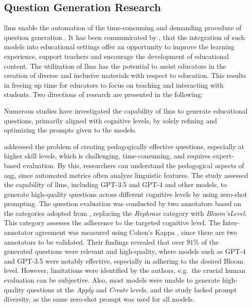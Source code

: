 \subsection{Question Generation Research}
\label{sec:question-generation-research}

\ac{llms} enable the automation of the time-consuming and demanding procedure of question generation \cite{vu_chatgpt-based_2024}. It has been communicated by \cite{naveed_comprehensive_2024}, that the integration of such models into educational settings offer an opportunity to improve the learning experience, support teachers and encourage the development of educational content. The utilization of \ac{llms} has the potential to assist educators in the creation of diverse and inclusive materials with respect to education. This results in freeing up time for educators to focus on teaching and interacting with students. Two directions of research are presented in the following:

 Numerous studies have investigated the capability of \ac{llms} to generate educational questions, primarily aligned with cognitive levels, by solely refining and optimizing the prompts given to the models.

\cite{scaria_how_2024} addressed the problem of creating pedagogically effective questions, especially at higher skill levels, which is challenging, time-consuming, and requires expert-based evaluation. By this, researchers can understand the pedagogical aspects of \ac{aqg}, since automated metrics often analyze linguistic features. The study assessed the capability of \ac{llms}, including GPT-3.5 and GPT-4 and other models, to generate high-quality questions across different cognitive levels by using zero-shot prompting. The question evaluation was conducted by two annotators based on the categories adopted from \cite{horbach_linguistic_2020}, replacing the \textit{Rephrase} category with \textit{Bloom'sLevel}. This category assesses the adherence to the targeted cognitive level. The Inter-annotator agreement was measured using Cohen's Kappa \cite{cohen_coefficient_1960}, since there are two annotators to be validated. Their findings revealed that over $91\%$ of the generated questions were relevant and high-quality, where models such as GPT-4 and GPT-3.5 were notably effective, especially in adhering to the desired Bloom level. However, limitations were identified by the authors, e.g.\ the crucial human evaluation can be subjective. Also, most models were unable to generate high-quality questions at the \textit{Apply} and \textit{Create} levels, and the study lacked prompt diversity, as the same zero-shot prompt was used for all models.

